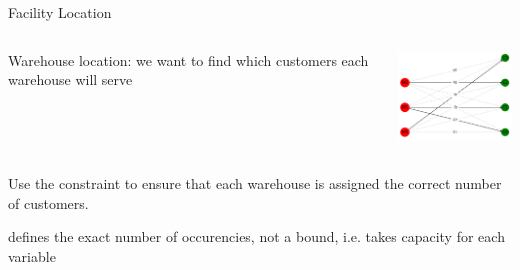 \documentclass{cons-beamer}
\begin{document}
\begin{frame}{Facility Location}
  \vspace{-1.5em}
  \begin{columns}
    \begin{column}{0.6\textwidth}
      Warehouse location: we want to find which customers each warehouse will serve
    \end{column}
    \begin{column}{0.4\textwidth}
      \includegraphics[width=40mm]{images/warehouse_plot.png} \\
    \end{column}
  \end{columns}

  \begin{example}
    \vfill
    Use the  constraint to ensure that each warehouse is assigned the correct number of customers.
    \vfill
  \end{example}

  \alert{ defines the exact number of occurencies, not a bound, i.e. takes capacity for each variable} \\ \vfill

   \\ \vfill
  \vfill
\end{frame}
\end{document}
